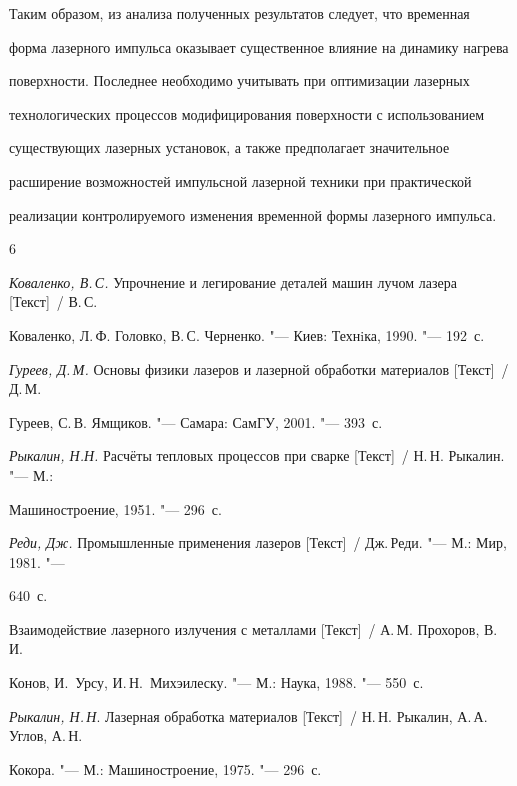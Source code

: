 Таким образом, из анализа полученных результатов следует, что временная 

форма лазерного импульса оказывает существенное влияние на динамику нагрева 

поверхности. Последнее необходимо учитывать при оптимизации лазерных 

технологических процессов модифицирования поверхности с использованием 

существующих лазерных установок, а также предполагает значительное 

расширение возможностей импульсной лазерной техники при практической 

реализации контролируемого изменения временной формы лазерного импульса.







\vspace{-3mm}



\begin{thebibliography}{6}

\item \textit{Коваленко, В.\,С.} Упрочнение и легирование деталей машин лучом лазера [Текст]~/ В.\,С. 

Коваленко, Л.\,Ф. Головко, В.\,С. Черненко. "--- Киев: Технiка, 1990. "--- 192~с.



\item \textit{Гуреев, Д.\,М.} Основы физики лазеров и лазерной обработки материалов [Текст]~/ Д.\,М. 

Гуреев, С.\,В. Ямщиков. "--- Самара: СамГУ, 2001. "--- 393~с.



\item \textit{Рыкалин, Н.Н.} Расчёты тепловых процессов при сварке [Текст]~/ Н.\,Н. Рыкалин. "--- М.: 

Машиностроение, 1951. "--- 296~с.



\item \textit{Реди, Дж.} Промышленные применения лазеров [Текст]~/ Дж.\,Реди. "--- М.: Мир, 1981. "--- 

640~с.



\item Взаимодействие лазерного излучения с металлами [Текст]~/ А.\,М. Прохоров, В.\,И. 

Конов, И.~Урсу, И.\,Н.~Михэилеску. "--- М.: Наука, 1988. "--- 550~с.



\item \textit{Рыкалин, Н.\,Н}. Лазерная обработка материалов [Текст]~/ Н.\,Н. Рыкалин, А.\,А. Углов, А.\,Н. 

Кокора. "--- М.: Машиностроение, 1975. "--- 296~с. 

\end{thebibliography}



\vspace{4mm}



\makeengtitle



%

